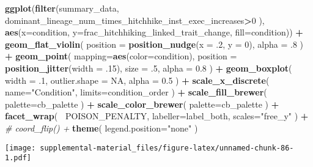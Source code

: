 \documentclass[]{book}
\newenvironment{Shaded}{\begin{snugshade}}{\end{snugshade}}
\newcommand{\CommentTok}[1]{\textcolor[rgb]{0.56,0.35,0.01}{\textit{#1}}}
\newcommand{\DataTypeTok}[1]{\textcolor[rgb]{0.13,0.29,0.53}{#1}}
\newcommand{\DecValTok}[1]{\textcolor[rgb]{0.00,0.00,0.81}{#1}}
\newcommand{\FloatTok}[1]{\textcolor[rgb]{0.00,0.00,0.81}{#1}}
\newcommand{\KeywordTok}[1]{\textcolor[rgb]{0.13,0.29,0.53}{\textbf{#1}}}
\newcommand{\NormalTok}[1]{#1}
\newcommand{\OperatorTok}[1]{\textcolor[rgb]{0.81,0.36,0.00}{\textbf{#1}}}
\newcommand{\OtherTok}[1]{\textcolor[rgb]{0.56,0.35,0.01}{#1}}
\newcommand{\StringTok}[1]{\textcolor[rgb]{0.31,0.60,0.02}{#1}}
\begin{document}
\begin{Shaded}
\begin{Highlighting}[]
\KeywordTok{ggplot}\NormalTok{(}\KeywordTok{filter}\NormalTok{(summary_data, dominant_lineage_num_times_hitchhike_inst_exec_increases}\OperatorTok{>}\DecValTok{0}\NormalTok{ ), }\KeywordTok{aes}\NormalTok{(}\DataTypeTok{x=}\NormalTok{condition, }\DataTypeTok{y=}\NormalTok{frac_hitchhiking_linked_trait_change, }\DataTypeTok{fill=}\NormalTok{condition)) }\OperatorTok{+}
\StringTok{  }\KeywordTok{geom_flat_violin}\NormalTok{(}
    \DataTypeTok{position =} \KeywordTok{position_nudge}\NormalTok{(}\DataTypeTok{x =} \FloatTok{.2}\NormalTok{, }\DataTypeTok{y =} \DecValTok{0}\NormalTok{),}
    \DataTypeTok{alpha =} \FloatTok{.8}
\NormalTok{  ) }\OperatorTok{+}
\StringTok{  }\KeywordTok{geom_point}\NormalTok{(}
    \DataTypeTok{mapping=}\KeywordTok{aes}\NormalTok{(}\DataTypeTok{color=}\NormalTok{condition),}
    \DataTypeTok{position =} \KeywordTok{position_jitter}\NormalTok{(}\DataTypeTok{width =} \FloatTok{.15}\NormalTok{),}
    \DataTypeTok{size =} \FloatTok{.5}\NormalTok{,}
    \DataTypeTok{alpha =} \FloatTok{0.8}
\NormalTok{  ) }\OperatorTok{+}
\StringTok{  }\KeywordTok{geom_boxplot}\NormalTok{(}
    \DataTypeTok{width =} \FloatTok{.1}\NormalTok{,}
    \DataTypeTok{outlier.shape =} \OtherTok{NA}\NormalTok{,}
    \DataTypeTok{alpha =} \FloatTok{0.5}
\NormalTok{  ) }\OperatorTok{+}
\StringTok{  }\KeywordTok{scale_x_discrete}\NormalTok{(}
    \DataTypeTok{name=}\StringTok{"Condition"}\NormalTok{,}
    \DataTypeTok{limits=}\NormalTok{condition_order}
\NormalTok{  ) }\OperatorTok{+}
\StringTok{  }\KeywordTok{scale_fill_brewer}\NormalTok{(}
    \DataTypeTok{palette=}\NormalTok{cb_palette}
\NormalTok{  ) }\OperatorTok{+}
\StringTok{  }\KeywordTok{scale_color_brewer}\NormalTok{(}
    \DataTypeTok{palette=}\NormalTok{cb_palette}
\NormalTok{  ) }\OperatorTok{+}
\StringTok{  }\KeywordTok{facet_wrap}\NormalTok{(}
    \OperatorTok{~}\NormalTok{POISON_PENALTY,}
    \DataTypeTok{labeller=}\NormalTok{label_both,}
    \DataTypeTok{scales=}\StringTok{"free_y"}
\NormalTok{  ) }\OperatorTok{+}
\StringTok{  }\CommentTok{# coord_flip() +}
\StringTok{  }\KeywordTok{theme}\NormalTok{(}
    \DataTypeTok{legend.position=}\StringTok{"none"}
\NormalTok{  )}
\end{Highlighting}
\end{Shaded}

\texttt{[image: supplemental-material\_files/figure-latex/unnamed-chunk-86-1.pdf]}
\end{document}
